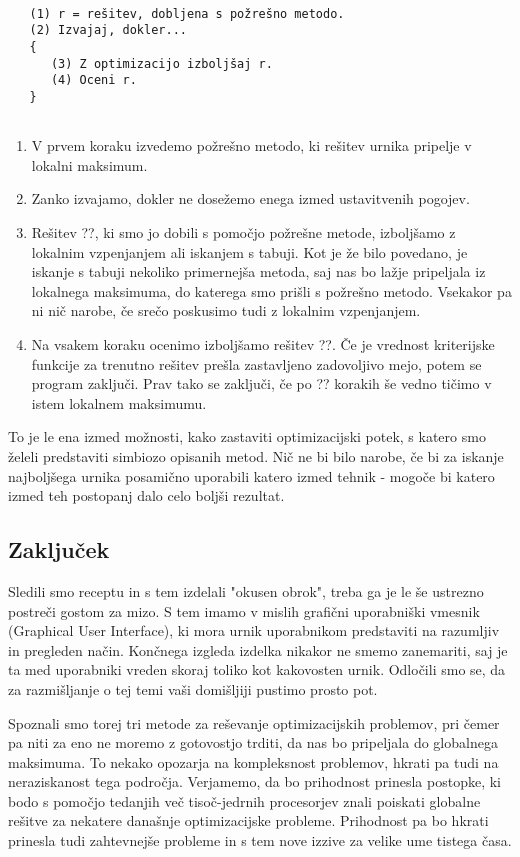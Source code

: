 \documentclass[a4paper, 10pt]{article}
\begin{document}
\begin{verbatim}
   
   (1) r = rešitev, dobljena s požrešno metodo.
   (2) Izvajaj, dokler...
   {
      (3) Z optimizacijo izboljšaj r.
      (4) Oceni r.
   }
   
\end{verbatim}

\begin{enumerate}
   
      \item V prvem koraku izvedemo požrešno metodo, ki rešitev urnika pripelje v lokalni maksimum.
   
      \item Zanko izvajamo, dokler ne dosežemo enega izmed ustavitvenih pogojev.
   
      \item Rešitev ??, ki smo jo dobili s pomočjo požrešne metode, izboljšamo z lokalnim vzpenjanjem
      ali iskanjem s tabuji. Kot je že bilo povedano, je iskanje s tabuji nekoliko primernejša metoda,
      saj nas bo lažje pripeljala iz lokalnega maksimuma, do katerega smo prišli s požrešno metodo.
      Vsekakor pa ni nič narobe, če srečo poskusimo tudi z lokalnim vzpenjanjem.
   
      \item Na vsakem koraku ocenimo izboljšamo rešitev ??. Če je vrednost kriterijske funkcije
      za trenutno rešitev prešla zastavljeno zadovoljivo mejo, potem se program zaključi. Prav tako
      se zaključi, če po ?? korakih še vedno tičimo v istem lokalnem maksimumu.
   
\end{enumerate}

To je le ena izmed možnosti, kako zastaviti optimizacijski potek, s katero smo želeli predstaviti
simbiozo opisanih metod. Nič ne bi bilo narobe, če bi za iskanje najboljšega urnika posamično
uporabili katero izmed tehnik - mogoče bi katero izmed teh postopanj dalo celo boljši rezultat.

\subsection{Zaključek}

Sledili smo receptu in s tem izdelali "okusen obrok", treba ga je le še ustrezno postreči
gostom za mizo. S tem imamo v mislih grafični uporabniški vmesnik (Graphical
User Interface), ki mora urnik uporabnikom predstaviti na razumljiv in
pregleden način. Končnega izgleda izdelka nikakor ne smemo zanemariti, saj je ta med uporabniki
vreden skoraj toliko kot kakovosten urnik. Odločili smo se, da za razmišljanje o tej temi vaši
domišljiji pustimo prosto pot.

Spoznali smo torej tri metode za reševanje optimizacijskih problemov, pri čemer pa niti za eno
ne moremo z gotovostjo trditi, da nas bo pripeljala do globalnega maksimuma. To nekako opozarja
na kompleksnost problemov, hkrati pa tudi na neraziskanost tega področja. Verjamemo, da bo
prihodnost prinesla postopke, ki bodo s pomočjo tedanjih več tisoč-jedrnih procesorjev znali
poiskati globalne rešitve za nekatere današnje optimizacijske probleme. Prihodnost pa bo
hkrati prinesla tudi zahtevnejše probleme in s tem nove izzive za velike ume tistega časa.
\end{document}
